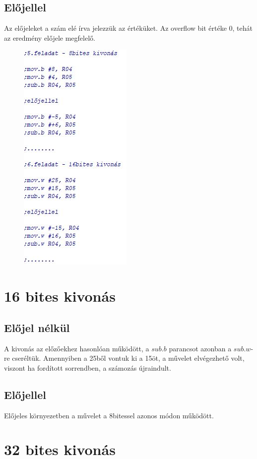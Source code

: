\documentclass[10pt, conference,a4paper]{ITKproc}
\begin{document}
\subsection{Előjellel}
Az előjeleket a szám elé írva jelezzük az értéküket. Az overflow bit értéke 0, tehát az eredmény előjele megfelelő. 

\begin{figure}[h]
\includegraphics[scale=0.5]{56feladat}
\centering

\end{figure}

\section{16 bites kivonás}
\subsection{Előjel nélkül}
A kivonás az előzőekhez hasonlóan működött, a $sub.b$ parancsot azonban a $sub.w$-re cseréltük. Amennyiben a 25ből vontuk ki a 15öt, a művelet elvégezhető volt, viszont ha fordított sorrendben, a számozás újraindult. 
\subsection{Előjellel}
Előjeles környezetben a művelet a 8bitessel azonos módon működött. 
\section{32 bites kivonás}
\end{document}
